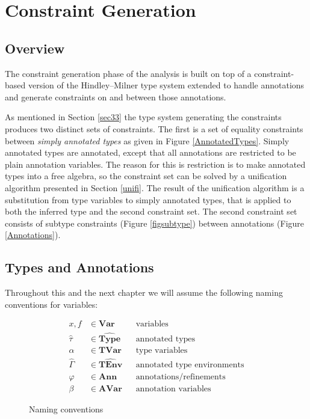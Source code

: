 \chapter{Constraint Generation}\label{chapcg}

\section{Overview}

The constraint generation phase of the analysis is built on top of a constraint-based version of the Hindley--Milner type system \cite{Milner78atheory,Pierce:2002:TPL:509043} extended to handle annotations and generate constraints on and between those annotations.

As mentioned in Section \ref{sec33} the type system generating the constraints produces two distinct sets of constraints. The first is a set of equality constraints between \emph{simply annotated types} as given in Figure \ref{AnnotatedTypes}. Simply annotated types are annotated, except that all annotations are restricted to be plain annotation variables. The reason for this is restriction is to make annotated types into a free algebra, so the constraint set can be solved by a unification algorithm presented in Section \ref{unifi}. The result of the unification algorithm is a substitution from type variables to simply annotated types, that is applied to both the inferred type and the second constraint set. The second constraint set consists of subtype constraints (Figure \ref{figsubtype}) between annotations (Figure \ref{Annotations}).

\section{Types and Annotations}

Throughout this and the next chapter we will assume the following naming conventions for variables:

\begin{figure}[h!t]
\begin{align*}
        x, f    & \in          \mathbf{Var}   &&\textrm{variables} \\
\widehat\tau    & \in \widehat{\mathbf{Type}} &&\textrm{annotated types} \\
        \alpha  & \in          \mathbf{TVar}  &&\textrm{type variables} \\
\widehat\Gamma  & \in \widehat{\mathbf{TEnv}} &&\textrm{annotated type environments} \\
        \varphi & \in          \mathbf{Ann}   &&\textrm{annotations/refinements} \\
        \beta   & \in          \mathbf{AVar}  &&\textrm{annotation variables}
\end{align*}
\caption{Naming conventions}
\label{NonTerminals}
\end{figure}

